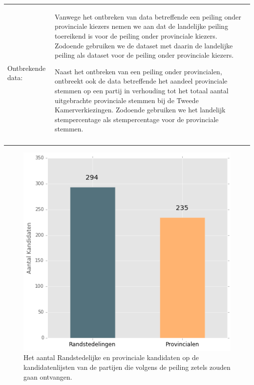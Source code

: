 \noindent\begin{tabularx}{\textwidth}{LI}
Ontbrekende data: &   Vanwege het ontbreken van data betreffende een peiling onder provinciale kiezers nemen we aan dat de landelijke peiling toereikend is voor de peiling onder provinciale kiezers. Zodoende gebruiken we de dataset met daarin de landelijke peiling als dataset voor de peiling onder provinciale kiezers.

\hspace*{1em} Naast het ontbreken van een peiling onder provincialen, ontbreekt ook de data betreffende het aandeel provinciale stemmen op een partij in verhouding tot het totaal aantal uitgebrachte provinciale stemmen bij de Tweede Kamerverkiezingen. Zodoende gebruiken we het landelijk stempercentage als stempercentage voor de provinciale stemmen.\\
\\
 \end{tabularx}



\begin{figure}[H]
\centering
	\includegraphics[width=0.42\linewidth]{rp_kandidaten.png}

			\caption{Het aantal Randstedelijke en provinciale kandidaten op de kandidatenlijsten van de partijen \citep{Kiesraad_databank} die volgens de peiling \citep{IPSOS} zetels zouden gaan ontvangen.}

\label{fig:rpKandidaten}
\end{figure}

















\iffalse

